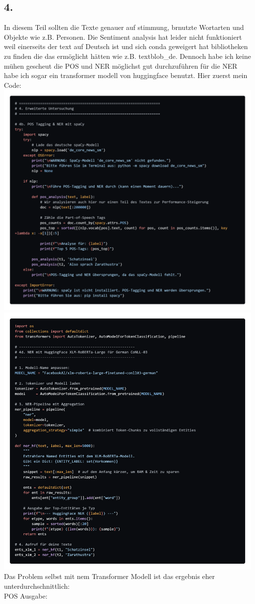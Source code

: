 \documentclass{scrartcl}
\begin{document}
\subsection*{4.}
In diesem Teil sollten die Texte genauer auf stimmung, brnutzte Wortarten und Objekte wie z.B. Personen. Die Sentiment analysis hat leider nicht funktioniert weil einerseits der text auf Deutsch ist und sich conda geweigert hat bibliotheken zu finden die das ermöglicht hätten wie z.B. textblob\_de. Dennoch habe ich keine mühen gescheut die POS und NER möglichst gut durchzuführen für die NER habe ich sogar ein transformer modell von huggingface benutzt. Hier zuerst mein Code:\\
\includegraphics*[scale=0.25]{POS.png}\\
\includegraphics*[scale=0.25]{NER.png}\\
Das Problem selbst mit nem Transformer Modell ist das ergebnis eher unterdurchschnittlich:\\
POS Ausgabe: 
\end{document}
